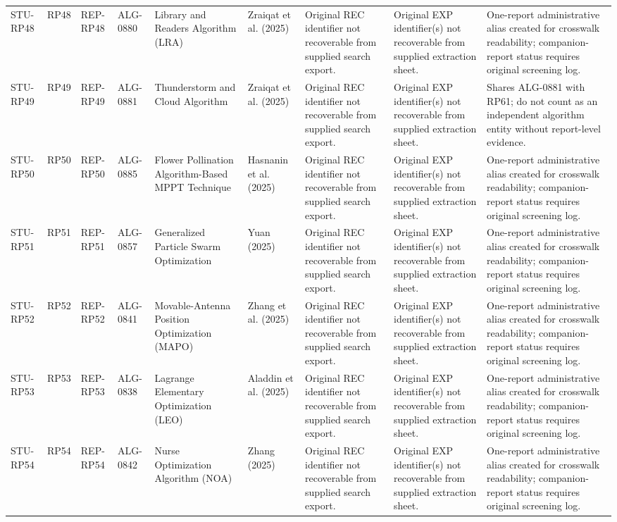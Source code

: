 \documentclass[9pt]{article}
\begin{document}
\begin{landscape}
\begin{longtable}{P{1.5cm}P{1.0cm}P{1.8cm}P{1.8cm}P{5.2cm}P{4.3cm}P{3.4cm}P{3.3cm}P{3.0cm}}
STU-RP48 & RP48 & REP-RP48 & ALG-0880 & Library and Readers Algorithm (LRA) & Zraiqat et al. (2025) & Original REC identifier not recoverable from supplied search export. & Original EXP identifier(s) not recoverable from supplied extraction sheet. & One-report administrative alias created for crosswalk readability; companion-report status requires original screening log. \\
STU-RP49 & RP49 & REP-RP49 & ALG-0881 & Thunderstorm and Cloud Algorithm & Zraiqat et al. (2025) & Original REC identifier not recoverable from supplied search export. & Original EXP identifier(s) not recoverable from supplied extraction sheet. & Shares ALG-0881 with RP61; do not count as an independent algorithm entity without report-level evidence. \\
STU-RP50 & RP50 & REP-RP50 & ALG-0885 & Flower Pollination Algorithm-Based MPPT Technique & Hasnanin et al. (2025) & Original REC identifier not recoverable from supplied search export. & Original EXP identifier(s) not recoverable from supplied extraction sheet. & One-report administrative alias created for crosswalk readability; companion-report status requires original screening log. \\
STU-RP51 & RP51 & REP-RP51 & ALG-0857 & Generalized Particle Swarm Optimization & Yuan (2025) & Original REC identifier not recoverable from supplied search export. & Original EXP identifier(s) not recoverable from supplied extraction sheet. & One-report administrative alias created for crosswalk readability; companion-report status requires original screening log. \\
STU-RP52 & RP52 & REP-RP52 & ALG-0841 & Movable-Antenna Position Optimization (MAPO) & Zhang et al. (2025) & Original REC identifier not recoverable from supplied search export. & Original EXP identifier(s) not recoverable from supplied extraction sheet. & One-report administrative alias created for crosswalk readability; companion-report status requires original screening log. \\
STU-RP53 & RP53 & REP-RP53 & ALG-0838 & Lagrange Elementary Optimization (LEO) & Aladdin et al. (2025) & Original REC identifier not recoverable from supplied search export. & Original EXP identifier(s) not recoverable from supplied extraction sheet. & One-report administrative alias created for crosswalk readability; companion-report status requires original screening log. \\
STU-RP54 & RP54 & REP-RP54 & ALG-0842 & Nurse Optimization Algorithm (NOA) & Zhang (2025) & Original REC identifier not recoverable from supplied search export. & Original EXP identifier(s) not recoverable from supplied extraction sheet. & One-report administrative alias created for crosswalk readability; companion-report status requires original screening log. \\

\end{longtable}
\end{landscape}
\end{document}
